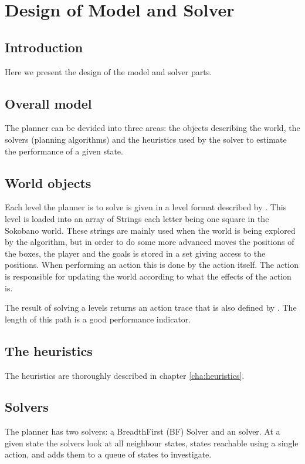 \chapter{Design of Model and Solver}
\label{cha:design}

\section{Introduction}
Here we present the design of the model and solver parts. 



\section{Overall model}
The planner can be devided into three areas: the objects describing
the world, the solvers (planning algorithms) and the heuristics used
by the \astar solver to estimate the performance of a given state.

\section{World objects}
Each level the planner is to solve is given in a level format
described by \citet{sokobano:level_format}. This level is loaded into
an array of Strings each letter being one square in the Sokobano
world. These strings are mainly used when the world is being explored
by the algorithm, but in order to do some more advanced moves the
positions of the boxes, the player and the goals is stored in a set
giving access to the positions.  When performing an action this is
done by the action itself. The action is responsible for updating the
world according to what the effects of the action is.

The result of solving a levels returns an action trace that is also
defined by \citet{sokobano:level_format}. The length of this path is 
a good performance indicator.

\section{The heuristics}
The heuristics are thoroughly described in chapter
\ref{cha:heuristics}.

\section{Solvers}
The planner has two solvers: a BreadthFirst (BF) Solver and an \astar
solver. At a given state the solvers look at all neighbour states,
states reachable using a single action, and adds them to a queue of
states to investigate.

